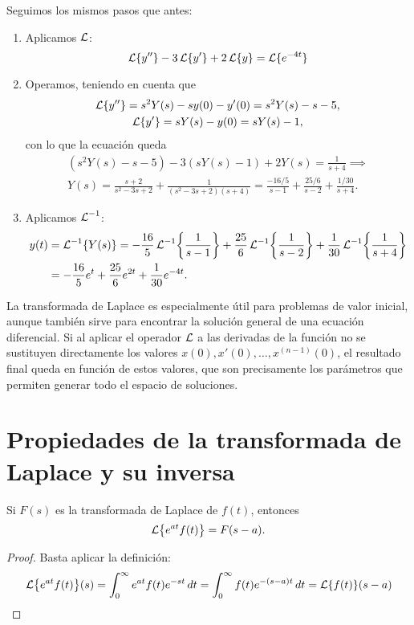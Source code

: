 \documentclass[../ecuaciones_diferenciales.tex]{subfiles}
\begin{document}
\begin{solution}
	Seguimos los mismos pasos que antes:
	\begin{enumerate}[(1)]
		\item Aplicamos \(\operatorname{\mathcal{L}}\):
		      \[\operatorname{\mathcal{L}}\{y''\} - 3\operatorname{\mathcal{L}}\{y'\} + 2\operatorname{\mathcal{L}}\{y\} = \operatorname{\mathcal{L}}\{e^{-4t}\}\]
		\item Operamos, teniendo en cuenta que
		      \begin{gather*}
			      \operatorname{\mathcal{L}}\{y''\} = s^2Y(s) - sy(0) - y'(0) = s^2Y(s) - s - 5, \\
			      \operatorname{\mathcal{L}}\{y'\} = sY(s) - y(0) = sY(s) - 1,
		      \end{gather*}
		      con lo que la ecuación queda
		      \begin{gather*}
			      \left(s^2Y(s) - s - 5\right) - 3\left(sY(s) - 1\right) + 2Y(s) =
			      \frac{1}{s+4} \implies \\
			      Y(s) = \frac{s+2}{s^2-3s+2} + \frac{1}{(s^2-3s+2)(s+4)} =
			      \frac{-16/5}{s-1} + \frac{25/6}{s-2} + \frac{1/30}{s+4}.
		      \end{gather*}
		\item Aplicamos \(\operatorname{\mathcal{L}}^{-1}\):
		      \begin{align*}
			      y(t) & = \laplace^{-1}\{Y(s)\}
			      = -\frac{16}{5}\laplace^{-1}\left\{\frac{1}{s-1}\right\}
			      + \frac{25}{6}\laplace^{-1}\left\{\frac{1}{s-2}\right\}
			      + \frac{1}{30}\laplace^{-1}\left\{\frac{1}{s+4}\right\} \\
			           & = -\frac{16}{5}e^t + \frac{25}{6}e^{2t}
			      + \frac{1}{30}e^{-4t}.
		      \end{align*}
	\end{enumerate}
\end{solution}

\begin{remark}
	La transformada de Laplace es especialmente útil para problemas de valor
	inicial, aunque también sirve para encontrar la solución general de una
	ecuación diferencial. Si al aplicar el operador \(\operatorname{\mathcal{L}}\) a las derivadas de la
	función no se sustituyen directamente los valores
	\(x(0), x'(0), \dots, x^{(n-1)}(0)\), el resultado final queda en función de
	estos valores, que son precisamente los parámetros que permiten generar todo
	el espacio de soluciones.
\end{remark}

\section{Propiedades de la transformada de Laplace y su inversa}
\begin{proposition}
	Si \(F(s)\) es la transformada de Laplace de \(f(t)\), entonces
	\[\laplace\left\{e^{at}f(t)\right\} = F(s-a).\]
	\begin{proof}
		Basta aplicar la definición:
		\[\laplace\left\{e^{at}f(t)\right\}(s) = \int_0^\infty e^{at}f(t) e^{-st} \dif t
			= \int_0^\infty f(t) e^{-(s-a)t} \dif t = \laplace\{f(t)\}(s-a)\]
	\end{proof}
\end{proposition}
\end{document}
